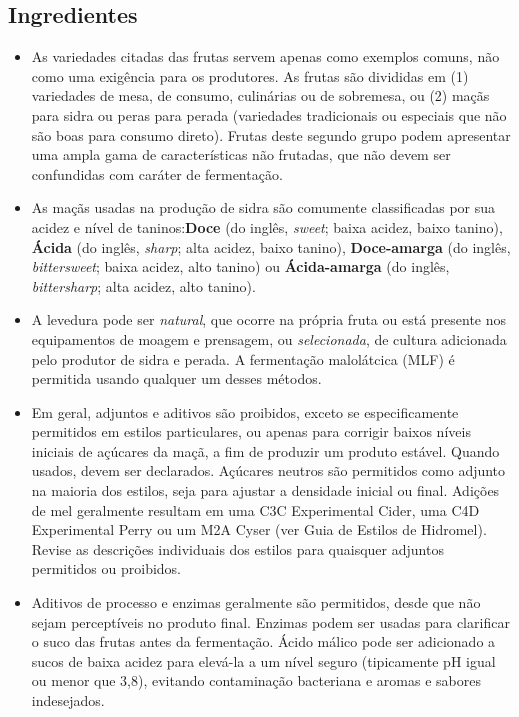 \subsection*{Ingredientes}

\begin{itemize}
\item As variedades citadas das frutas servem apenas como exemplos comuns, não como uma exigência para os produtores. As frutas são divididas em (1) variedades de mesa, de consumo, culinárias ou de sobremesa, ou (2) maçãs para sidra ou peras para perada (variedades tradicionais ou especiais que não são boas para consumo direto). Frutas deste segundo grupo podem apresentar uma ampla gama de características não frutadas, que não devem ser confundidas com caráter de fermentação.
\item As maçãs usadas na produção de sidra são comumente classificadas por sua acidez e nível de taninos:\textbf{Doce} (do inglês, \textit{sweet}; baixa acidez, baixo tanino), \textbf{Ácida} (do inglês, \textit{sharp}; alta acidez, baixo tanino), \textbf{Doce-amarga} (do inglês, \textit{bittersweet}; baixa acidez, alto tanino) ou \textbf{Ácida-amarga} (do inglês, \textit{bittersharp}; alta acidez, alto tanino).
\item A levedura pode ser \textit{natural}, que ocorre na própria fruta ou está presente nos equipamentos de moagem e prensagem, ou \textit{selecionada}, de cultura adicionada pelo produtor de sidra e perada. A fermentação malolátcica (MLF) é permitida usando qualquer um desses métodos.
\item Em geral, adjuntos e aditivos são proibidos, exceto se especificamente permitidos em estilos particulares, ou apenas para corrigir baixos níveis iniciais de açúcares da maçã, a fim de produzir um produto estável. Quando usados, devem ser declarados. Açúcares neutros são permitidos como adjunto na maioria dos estilos, seja para ajustar a densidade inicial ou final. Adições de mel geralmente resultam em uma C3C Experimental Cider, uma C4D Experimental Perry ou um M2A Cyser (ver Guia de Estilos de Hidromel). Revise as descrições individuais dos estilos para quaisquer adjuntos permitidos ou proibidos.
\item Aditivos de processo e enzimas geralmente são permitidos, desde que não sejam perceptíveis no produto final. Enzimas podem ser usadas para clarificar o suco das frutas antes da fermentação. Ácido málico pode ser adicionado a sucos de baixa acidez para elevá-la a um nível seguro (tipicamente pH igual ou menor que 3,8), evitando contaminação bacteriana e aromas e sabores indesejados.

\end{itemize}
